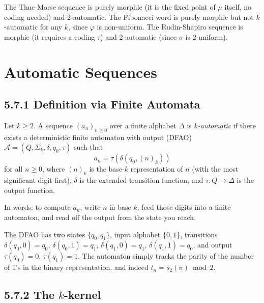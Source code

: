 \begin{example}
The Thue-Morse sequence is purely morphic (it is the fixed point of $\mu$ itself, no coding needed) and 2-automatic. The Fibonacci word is purely morphic but not $k$-automatic for any $k$, since $\varphi$ is non-uniform. The Rudin-Shapiro sequence is morphic (it requires a coding $\tau$) and 2-automatic (since $\sigma$ is 2-uniform).
\end{example}



\section{Automatic Sequences}

\subsection{5.7.1 Definition via Finite Automata}

\begin{definition}
Let $k \geq 2$. A sequence $(a_n)_{n \geq 0}$ over a finite alphabet $\Delta$ is \textit{$k$-automatic} if there exists a deterministic finite automaton with output (DFAO) $\mathcal{A} = (Q, \Sigma_k, \delta, q_0, \tau)$ such that
\[a_n = \tau(\delta(q_0, (n)_k))\]
for all $n \geq 0$, where $(n)_k$ is the base-$k$ representation of $n$ (with the most significant digit first), $\delta$ is the extended transition function, and $\tau: Q \to \Delta$ is the output function.

In words: to compute $a_n$, write $n$ in base $k$, feed those digits into a finite automaton, and read off the output from the state you reach.
\end{definition}

\begin{example}
The DFAO has two states $\{ q_0, q_1\} $, input alphabet $\{ 0,1\} $, transitions $\delta(q_0, 0) = q_0$, $\delta(q_0, 1) = q_1$, $\delta(q_1, 0) = q_1$, $\delta(q_1, 1) = q_0$, and output $\tau(q_0) = 0$, $\tau(q_1) = 1$. The automaton simply tracks the parity of the number of $1$'s in the binary representation, and indeed $t_n = s_2(n) \bmod 2$.
\end{example}

\subsection{5.7.2 The $k$-kernel}

